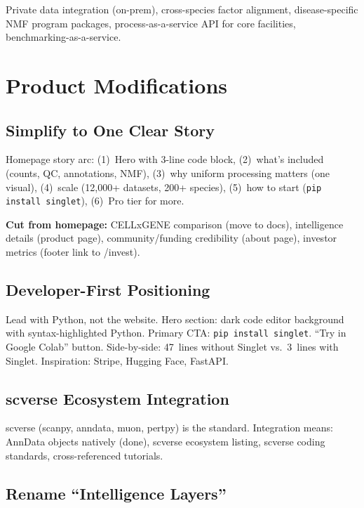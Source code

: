\documentclass[10pt,twocolumn,letterpaper]{article}
\begin{document}
Private data integration (on-prem), cross-species factor alignment,
disease-specific NMF program packages, process-as-a-service API for core
facilities, benchmarking-as-a-service.

\section{Product Modifications}
\label{sec:modifications}

\subsection{Simplify to One Clear Story}

Homepage story arc: (1)~Hero with 3-line code block, (2)~what's included
(counts, QC, annotations, NMF), (3)~why uniform processing matters (one visual),
(4)~scale (12,000+ datasets, 200+ species), (5)~how to start
(\texttt{pip install singlet}), (6)~Pro tier for more.

\textbf{Cut from homepage:} CELLxGENE comparison (move to docs), intelligence
details (product page), community/funding credibility (about page), investor
metrics (footer link to /invest).

\subsection{Developer-First Positioning}

Lead with Python, not the website. Hero section: dark code editor background
with syntax-highlighted Python. Primary CTA: \texttt{pip install singlet}.
``Try in Google Colab'' button. Side-by-side: 47~lines without Singlet vs.\
3~lines with Singlet. Inspiration: Stripe, Hugging Face, FastAPI.

\subsection{scverse Ecosystem Integration}

scverse (scanpy, anndata, muon, pertpy) is the standard. Integration means:
AnnData objects natively (done), scverse ecosystem listing, scverse coding
standards, cross-referenced tutorials.

\subsection{Rename ``Intelligence Layers''}
\end{document}
